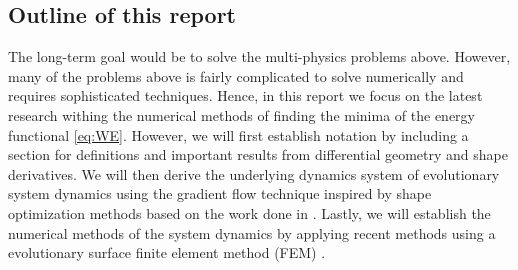 \subsection{Outline of this report}%
\label{sub:outline_of_this_report}

The long-term goal would be to solve the multi-physics problems above. However, many of the problems above is fairly complicated to solve numerically and requires sophisticated techniques. Hence, in this report we focus on the latest research withing
the numerical methods of finding the minima of the energy functional \eqref{eq:WE}. However, we will first establish notation by including a section for definitions and important results from differential geometry and shape derivatives. We will then derive the
underlying dynamics system of evolutionary system dynamics using the gradient flow technique inspired by shape optimization methods based on the work done in \cite{ dougan2012first}. Lastly, we will establish the numerical methods of the system
dynamics by applying recent methods using a evolutionary surface finite element method (FEM) \cite{kovacs2021convergent, hu2022evolving}.



